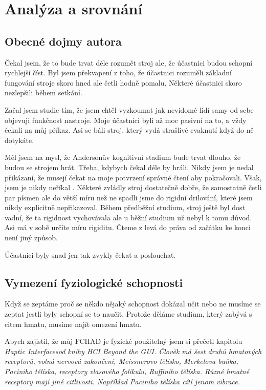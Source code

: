 \chapter{Analýza a srovnání}

\section{Obecné dojmy autora}
Čekal jsem, že to bude trvat déle rozumět stroj ale, že účastnici budou schopní rychlejší číst.  Byl jsem překvapení z toho, že účastnici rozuměli základní fungování stroje skoro hned ale četli hodně pomalu.  Některé účastnici skoro nezlepšili během setkání.

Začal jsem studie tím, že jsem chtěl vyzkoumat jak nevidomé lidí samy od sebe objevuji funkčnost nastroje.  Moje účastnici byli až moc pasivní na to, a vždy čekali na můj příkaz.  Asi se báli stroj, který vydá strašlivé cvaknutí když do ně dotykáte.

Měl jsem na mysl, že Andersonův kognitivní stadium bude trvat dlouho, že budou se strojem hrát.  Třeba, kdybych čekal déle by hráli.  Nikdy jsem je nedal přikázaní, že musejí čekat na moje potvrzení správné čtení aby pokračovali. Však, jsem je nikdy neříkal . Některé zvládly stroj dostatečně dobře, že samostatně četli par písmen ale do větší míru než ne spadli jsme do rigidní drilování, které jsem nikdy explicitně nepřikazoval.  Během předběžní studium, stroj ještě byl dost vadní, že ta rigidnost vychovávala ale u běžní studium už nebyl k tomu důvod.  Asi  má v sobě určíte míru rigiditu.  Čteme z levá do práva od začátku ke konci není jiný způsob.

Účastnici byly snad jen tak zvykly čekat a poslouchat.

\section{Vymezení fyziologické schopnosti}
Když se zeptáme proč se někdo nějaký schopnost dokázal učit nebo ne musíme se zeptat jestli byly schopní se to naučit.  Protože děláme studium, který zabývá s citem hmatu, musíme najít omezení hmatu.

Abych zajistil, že můj FCHAD je fyzické použitelný jsem si přečetl kapitolu \em Haptic Interfaces\em  od knihy \em HCI Beyond the GUI\em. Člověk má šest druhů hmatových receptorů, volná nervová zakončení, Meissnerovo tělísko, Merkelova buňka, Paciniho tělíska, receptory vlasového folikulu, Ruffiniho tělíska. Různé hmatné receptory mají jiné citlivosti.  Například Paciniho tělíska cítí jenom vibrace.

